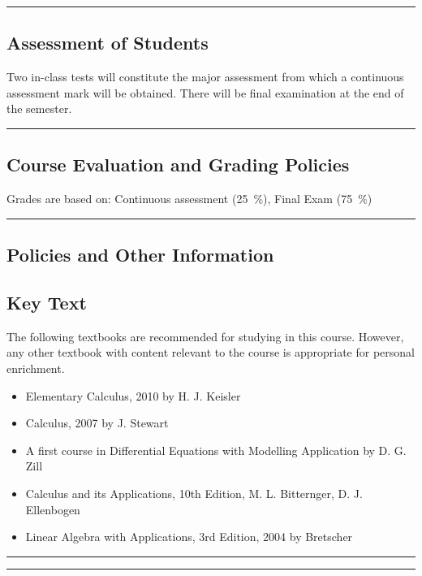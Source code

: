 \vspace{2ex} \hrule\vspace{2ex}

\subsection*{Assessment of Students}
Two in-class tests will constitute the major assessment from which a continuous assessment mark will be obtained.
There will be final examination at the end of the semester.
\vspace{2ex}\hrule\vspace{2ex}

\subsection*{Course Evaluation and Grading Policies}
Grades are based on:
Continuous assessment (\qty{25}{\percent}),
Final Exam (\qty{75}{\percent})
\vspace{2ex}\hrule\vspace{2ex}



\subsection*{Policies and Other Information}
\subsection*{Key Text}
The following textbooks are recommended for studying in this course.
However, any other textbook with content relevant to the course is appropriate for personal enrichment.
\begin{itemize}
    \item Elementary Calculus, 2010 by H. J. Keisler
    \item Calculus, 2007 by J. Stewart
    \item A first course in Differential Equations with Modelling Application by D. G. Zill
    \item Calculus and its Applications, 10th Edition, M. L. Bitternger, D. J. Ellenbogen
    \item Linear Algebra with Applications, 3rd Edition, 2004 by Bretscher
\end{itemize}
\vspace{2ex}\hrule
\vspace{2ex}\hrule\vspace{2ex}
